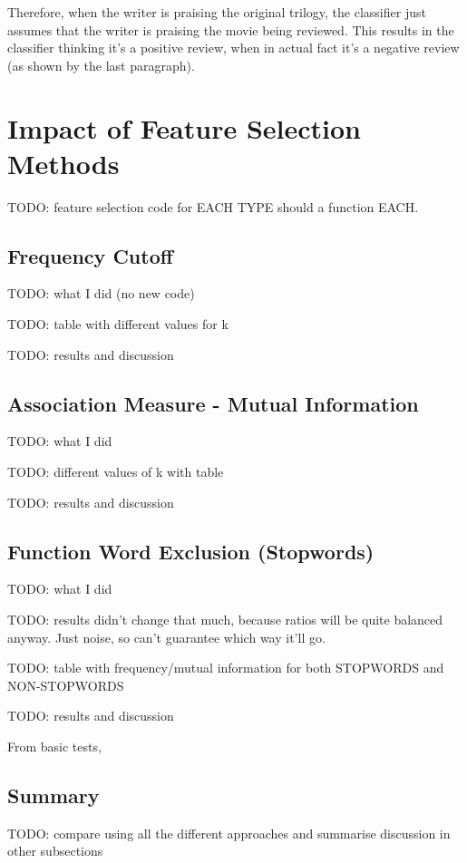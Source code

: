 \documentclass{article}
\begin{document}
Therefore, when the writer is praising the original trilogy, the classifier just assumes that the writer is praising the movie being reviewed. This results in the classifier thinking it's a positive review, when in actual fact it's a negative review (as shown by the last paragraph).

\section{Impact of Feature Selection Methods}

TODO: feature selection code for EACH TYPE should a function EACH. 

\subsection{Frequency Cutoff}

TODO: what I did (no new code)

TODO: table with different values for k

TODO: results and discussion

\subsection{Association Measure - Mutual Information}

TODO: what I did

TODO: different values of k with table

TODO: results and discussion

\subsection{Function Word Exclusion (Stopwords)}

TODO: what I did

TODO: results didn't change that much, because ratios will be quite balanced anyway. Just noise, so can't guarantee which way it'll go.

TODO: table with frequency/mutual information for both STOPWORDS and NON-STOPWORDS

TODO: results and discussion

From basic tests,

\subsection{Summary}

TODO: compare using all the different approaches and summarise discussion in other subsections
\end{document}
